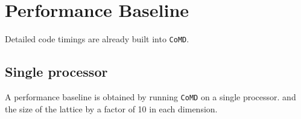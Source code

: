 \documentclass[12pt]{article}
\begin{document}




\section{Performance Baseline}

Detailed code timings are already built into \texttt{CoMD}. 



%
% 
%

%
% 
%
\subsection{Single processor}
A performance baseline is obtained by running \texttt{CoMD} on a single processor.
and the size of the lattice by a factor of 10 in each dimension.
\end{document}
